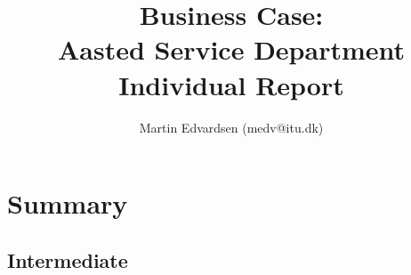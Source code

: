 \documentclass{report}
\title
{
	\textbf{Business Case: \\ Aasted Service Department} \\
	Individual Report
}
\author
{
	Martin Edvardsen (medv@itu.dk) \\
}
\begin{document}
\maketitle
\tableofcontents
\newpage
\listoffigures
\newpage
\listoftables
\newpage

\chapter{Summary}





\begin{appendices}
	\chapter{Intermediate}\label{interviews}
\end{appendices}
\end{document}
